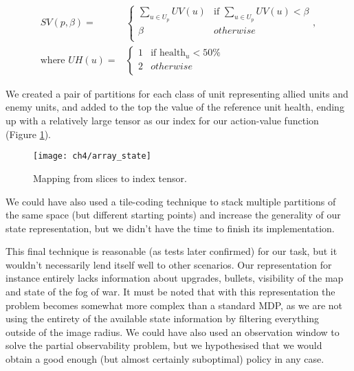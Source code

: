 \begin{equation}
  \begin{aligned}
    SV(p, \beta) = & 
    \begin{cases}
      \sum_{u \in U_p}{UV(u)} & \text{if } \sum_{u \in U_p}{UV(u)} < \beta \\
      \beta & otherwise\\
    \end{cases}, \\ \text{where } 
    UH(u) = &
    \begin{cases}
      1 & \text{if } \text{health}_u < 50\%\\
      2 & otherwise \\
    \end{cases} 
  \end{aligned}
\end{equation}

We created a pair of partitions for each class of unit representing allied units
and enemy units, and added to the top the value of the reference unit health,
ending up with a relatively large tensor as our index for our action-value
function (Figure \ref{fig:array_state}).

\begin{figure}[h]
    \centering
    \texttt{[image: ch4/array\_state]}
    \caption{Mapping from slices to index tensor.}
    \label{fig:array_state}
\end{figure}

We could have also used a tile-coding technique\citep{sherstov2005function} to
stack multiple partitions of the same space (but different starting points) and
increase the generality of our state representation, but we didn't have the time
to finish its implementation.

This final technique is reasonable (as tests later confirmed) for our task, but
it wouldn't necessarily lend itself well to other scenarios. Our representation
for instance entirely lacks information about upgrades, bullets, visibility of
the map and state of the fog of war. It must be noted that with this
representation the problem becomes somewhat more complex than a standard MDP, as
we are not using the entirety of the available state information by filtering
everything outside of the image radius. We could have also used an observation
window to solve the partial observability problem, but we hypothesised that we
would obtain a good enough (but almost certainly suboptimal) policy in any case.

